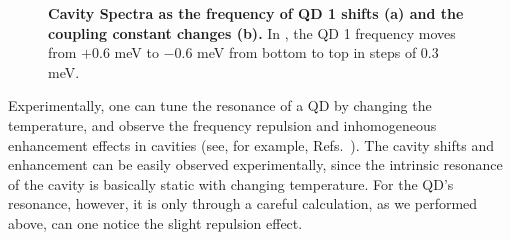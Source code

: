 \begin{figure}[htp]%
\centering
\caption[Cavity Spectra as QD 1 shifts and the coupling constant changes.]{\textbf{Cavity Spectra as the frequency of QD 1 shifts (a) and the coupling constant changes (b).} In , the QD 1 frequency moves from $+0.6$ meV to $-0.6$ meV from bottom to top in steps of $0.3$ meV.
 }
\end{figure}

Experimentally, one can tune the resonance of a QD by changing the temperature, and observe the frequency repulsion and inhomogeneous enhancement effects in cavities (see, for example, Refs.~). The cavity shifts and enhancement can be easily observed experimentally, since the intrinsic resonance of the cavity is basically static with changing temperature. For the QD's resonance, however, it is only through a careful calculation, as we performed above, can one notice the slight repulsion effect.

